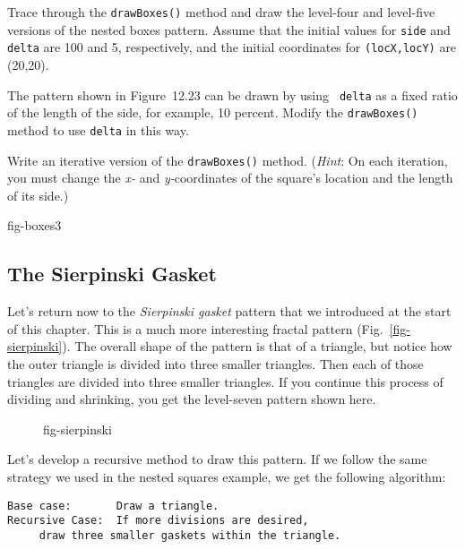 \begin{SSTUDY}

\item Trace through the {\tt drawBoxes()} method and draw the
level-four and level-five versions of the nested boxes pattern.
Assume that the initial values for {\tt side} and {\tt delta} are 100
and 5, respectively, and the initial coordinates for {\tt (locX,locY)}
are (20,20).

\item The pattern shown in Figure~12.23 can be drawn by using {\tt
delta} as a fixed ratio of the length of the side, for example, 10
percent.  Modify the {\tt drawBoxes()} method to use {\tt delta} in
this way.

\item Write an iterative version of the {\tt drawBoxes()} method.
({\it Hint}: On each iteration, you must change the {\it x-} and {\it
y-}coordinates of the square's location and the length of its side.)

{fig-boxes3}

\end{SSTUDY}

\subsection{The Sierpinski Gasket}
\noindent Let's return now to the {\it Sierpinski gasket} pattern that we
introduced at the start of this chapter.  This is a much more
interesting fractal pattern (Fig.~\ref{fig-sierpinski}). The overall
shape of the pattern is that of a triangle, but notice how the outer
triangle is divided into three smaller triangles.  Then each of those
triangles are divided into three smaller triangles.  If you continue
this process of dividing and shrinking, you get the level-seven pattern
shown here.

\begin{figure}[hbt]
{fig-sierpinski}
\end{figure}

Let's develop a recursive method to draw this pattern.  If we follow
the same strategy we used in the nested squares example, we get the
following algorithm:

\begin{jjjlisting}
\begin{lstlisting}
Base case:       Draw a triangle.
Recursive Case:  If more divisions are desired,
     draw three smaller gaskets within the triangle.
\end{lstlisting}
\end{jjjlisting}

